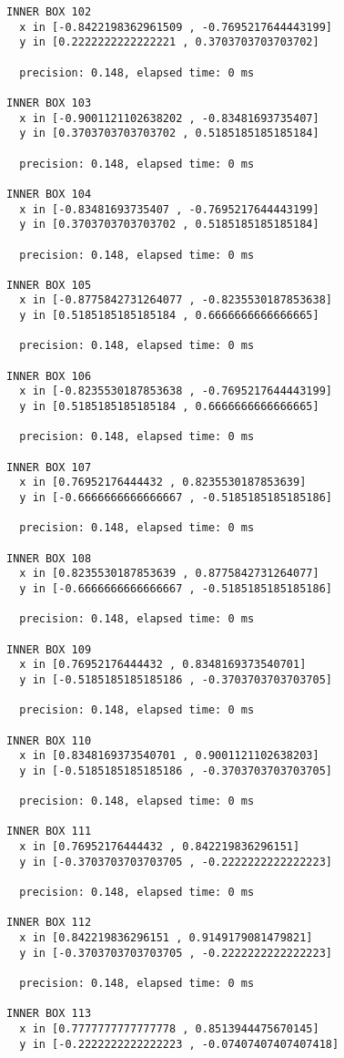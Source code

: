 \begin{verbatim}
INNER BOX 102
  x in [-0.8422198362961509 , -0.7695217644443199]
  y in [0.2222222222222221 , 0.3703703703703702]

  precision: 0.148, elapsed time: 0 ms

INNER BOX 103
  x in [-0.9001121102638202 , -0.83481693735407]
  y in [0.3703703703703702 , 0.5185185185185184]

  precision: 0.148, elapsed time: 0 ms

INNER BOX 104
  x in [-0.83481693735407 , -0.7695217644443199]
  y in [0.3703703703703702 , 0.5185185185185184]

  precision: 0.148, elapsed time: 0 ms

INNER BOX 105
  x in [-0.8775842731264077 , -0.8235530187853638]
  y in [0.5185185185185184 , 0.6666666666666665]

  precision: 0.148, elapsed time: 0 ms

INNER BOX 106
  x in [-0.8235530187853638 , -0.7695217644443199]
  y in [0.5185185185185184 , 0.6666666666666665]

  precision: 0.148, elapsed time: 0 ms

INNER BOX 107
  x in [0.76952176444432 , 0.8235530187853639]
  y in [-0.6666666666666667 , -0.5185185185185186]

  precision: 0.148, elapsed time: 0 ms

INNER BOX 108
  x in [0.8235530187853639 , 0.8775842731264077]
  y in [-0.6666666666666667 , -0.5185185185185186]

  precision: 0.148, elapsed time: 0 ms

INNER BOX 109
  x in [0.76952176444432 , 0.8348169373540701]
  y in [-0.5185185185185186 , -0.3703703703703705]

  precision: 0.148, elapsed time: 0 ms

INNER BOX 110
  x in [0.8348169373540701 , 0.9001121102638203]
  y in [-0.5185185185185186 , -0.3703703703703705]

  precision: 0.148, elapsed time: 0 ms

INNER BOX 111
  x in [0.76952176444432 , 0.842219836296151]
  y in [-0.3703703703703705 , -0.2222222222222223]

  precision: 0.148, elapsed time: 0 ms

INNER BOX 112
  x in [0.842219836296151 , 0.9149179081479821]
  y in [-0.3703703703703705 , -0.2222222222222223]

  precision: 0.148, elapsed time: 0 ms

INNER BOX 113
  x in [0.7777777777777778 , 0.8513944475670145]
  y in [-0.2222222222222223 , -0.07407407407407418]


\end{verbatim}
